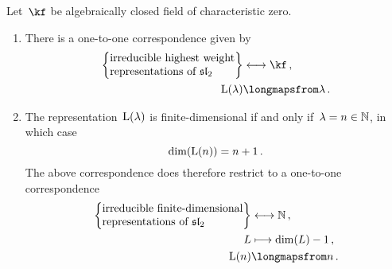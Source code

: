 \documentclass[a4paper, 11pt, oneside]{scrartcl}
\begin{document}
\begin{theorem}
  Let~$\kf$ be algebraically closed field of characteristic zero.
  \begin{enumerate}
    \item
      There is a one-to-one correspondence given by
      \begin{align*}
        \left\{
          \begin{tabular}{@{}l@{}}
            irreducible highest weight\\
            representations of~$\sllie_2$
          \end{tabular}
        \right\}
        &\longleftrightarrow
        \kf \,,
        \\
        \irred(\lambda)
        &\longmapsfrom
        \lambda \,.
      \end{align*}
    \item
      The representation~$\operatorname{L}(\lambda)$ is finite-dimensional if and only if~$\lambda = n \in \mathbb{N}$, in which case
      \[
        \dim(\operatorname{L}(n))
        =
        n + 1 \,.
      \]
      The above correspondence does therefore restrict to a one-to-one correspondence
      \begin{align*}
        \left\{
          \begin{tabular}{@{}l@{}}
            irreducible finite-dimensional\\
            representations of~$\sllie_2$
          \end{tabular}
        \right\}
        &\longleftrightarrow
        \Natural \,,
        \\
        L
        &\longmapsto
        \dim(L) - 1 \,,
        \\
        \irred(n)
        &\longmapsfrom
        n \,.
      \end{align*}
  \end{enumerate}
\end{theorem}
\end{document}
